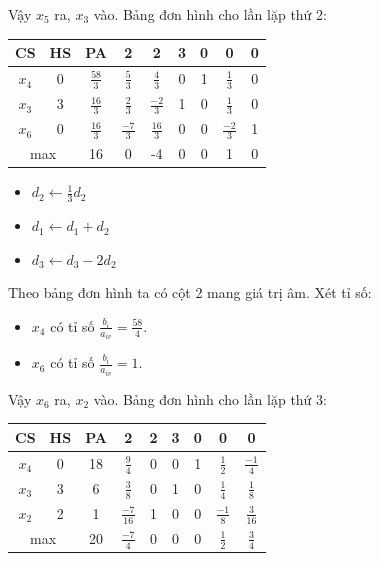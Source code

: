 \documentclass[12pt]{article}
\begin{document}
\noindent Vậy $x_5$ ra, $x_3$ vào. Bảng đơn hình cho lần lặp thứ 2:
\begin{table}[H]
\centering
\begin{tabular}{|c|c|c|c|c|c|c|c|c|}
\hline
CS & HS & PA & 2 & 2 & 3 & 0 & 0 & 0 \\
\hline
$x_4$ & 0 & $\frac{58}{3}$ & $ \frac{5}{3}$ & $ \frac{4}{3}$ & 0 & 1 & $ \frac{1}{3}$ & 0 \\
$x_3$ & 3 & $\frac{16}{3}$ & $ \frac{2}{3}$ & $ \frac{-2}{3}$ & 1 & 0 & $ \frac{1}{3}$ & 0 \\
$x_6$ & 0 & $ \frac{16}{3}$ & $ \frac{-7}{3}$ & $ \frac{16}{3}$ & 0 & 0 & $ \frac{-2}{3}$ & 1 \\
\hline
\multicolumn{2}{|c|}{max}
& 16 & 0 & -4 & 0 & 0 & 1 & 0 \\
\hline
\end{tabular}
\end{table}
\begin{itemize}
\item $\displaystyle d_2 \leftarrow \frac{1}{3}d_2$
\item $\displaystyle d_1 \leftarrow d_1 + d_2$
\item $\displaystyle d_3 \leftarrow d_3 - 2d_2$
\end{itemize}
Theo bảng đơn hình ta có cột 2 mang giá trị âm. Xét tỉ số:
\begin{itemize}
    \item $x_4$ có tỉ số $\displaystyle \frac{b_i}{a_{iv}} = \frac{58}{4}$.
    \item $x_6$ có tỉ số $\displaystyle \frac{b_i}{a_{iv}} = 1$.
\end{itemize}
Vậy $x_6$ ra, $x_2$ vào. Bảng đơn hình cho lần lặp thứ 3:
\begin{table}[H]
\centering
\begin{tabular}{|c|c|c|c|c|c|c|c|c|}
\hline
CS & HS & PA & 2 & 2 & 3 & 0 & 0 & 0 \\
\hline
$x_4$ & 0 & 18 & $ \frac{9}{4}$ & 0 & 0 & 1 & $ \frac{1}{2}$ & $\frac{-1}{4}$ \\
$x_3$ & 3 & 6 & $ \frac{3}{8}$ & 0 & 1 & 0 & $ \frac{1}{4}$ & $\frac{1}{8}$ \\
$x_2$ & 2 & 1 & $ \frac{-7}{16}$ & 1 & 0 & 0 & $\frac{-1}{8}$ & $\frac{3}{16}$ \\
\hline
\multicolumn{2}{|c|}{max}
& 20 & $\frac{-7}{4}$ & 0 & 0 & 0 & $\frac{1}{2}$ & $\frac{3}{4}$ \\
\hline
\end{tabular}
\end{table}
\end{document}
